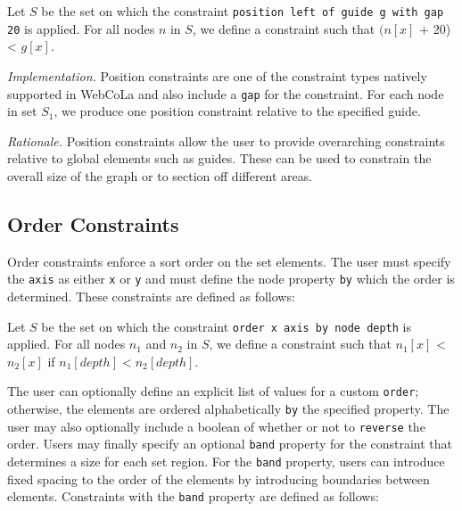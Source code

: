 \begin{definition}
Let $S$ be the set on which the constraint \texttt{position left of guide g with gap 20} is applied.
For all nodes $n$ in $S$, we define a constraint such that $(n[x]$ + 20) < $g[x]$.
\end{definition}

\emph{Implementation.}
Position constraints are one of the constraint types natively supported in
WebCoLa and also include a \texttt{gap} for the constraint. For each node
in set $S_1$, we produce one position constraint relative to the specified guide.

\emph{Rationale.} Position constraints allow the user to provide
overarching constraints relative to global elements such as guides. These
can be used to constrain the overall size of the graph or to section off
different areas.



\subsection{Order Constraints}

Order constraints enforce a sort order on the set elements. The user must 
specify the \texttt{axis} as either \texttt{x} or \texttt{y} and must define
the node property \texttt{by} which the order is determined. These 
constraints are defined as follows:

\begin{definition}
Let $S$ be the set on which the constraint \texttt{order x axis by node depth} is applied.
For all nodes $n_1$ and $n_2$ in $S$, we define a constraint such that $n_1[x]$ < $n_2[x]$
if $n_1[depth] < n_2[depth]$.
\end{definition}

The user can optionally define an explicit list of values for a custom
\texttt{order}; otherwise, the elements are ordered alphabetically \texttt{by}
the specified property. The user may also optionally include a boolean of whether
or not to \texttt{reverse} the order. Users may finally specify an optional
\texttt{band} property for the constraint that determines a size for each
set region. For the \texttt{band} property, users can introduce fixed spacing
to the order of the elements by introducing boundaries between elements.
Constraints with the \texttt{band} property are defined as follows:

